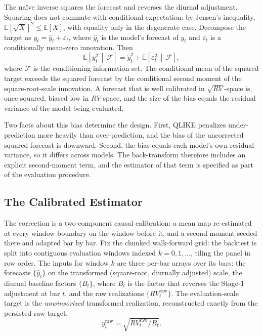 The na\"ive inverse squares the forecast and reverses the diurnal
adjustment. Squaring does not commute with conditional expectation: by
Jensen's inequality, $\mathbb{E}[\sqrt{X}]^2 \le \mathbb{E}[X]$, with
equality only in the degenerate case. Decompose the target as
$y_{t} = \hat{y}_{t} + \varepsilon_{t}$, where $\hat{y}_t$ is the model's
forecast of $y_t$ and $\varepsilon_t$ is a conditionally mean-zero
innovation. Then
\begin{equation}
    \mathbb{E}\!\left[y_t^2 \,\middle|\, \mathcal{F}\right]
    = \hat{y}_t^2 + \mathbb{E}\!\left[\varepsilon_t^2 \,\middle|\, \mathcal{F}\right],
    \label{eq:second_moment}
\end{equation}
where $\mathcal{F}$ is the conditioning information set. The conditional mean
of the squared target exceeds the squared forecast by the conditional second
moment of the square-root-scale innovation. A forecast that is well
calibrated in $\sqrt{RV}$-space is, once squared, biased low in $RV$-space,
and the size of the bias equals the residual variance of the model being
evaluated.

Two facts about this bias determine the design. First, QLIKE penalizes
under-prediction more heavily than over-prediction, and the bias of the
uncorrected squared forecast is downward. Second, the bias equals each
model's own residual variance, so it differs across models. The
back-transform therefore includes an explicit second-moment term, and the
estimator of that term is specified as part of the evaluation procedure.

\subsection{The Calibrated Estimator}
\label{sec:smearing_estimator}
\label{sec:smearing}

The correction is a two-component causal calibration: a mean map
re-estimated at every window boundary on the window before it, and a
second moment seeded there and adapted bar by bar. Fix the chunked
walk-forward grid: the backtest is split into contiguous evaluation
windows indexed $k = 0, 1, \dots$, tiling the panel in row order. The
inputs for window $k$ are three per-bar arrays over its bars: the
forecasts $\{\hat{y}_t\}$ on the transformed (square-root, diurnally
adjusted) scale, the diurnal baseline factors $\{B_t\}$, where $B_t$ is
the factor that reverses the Stage-1 adjustment at bar $t$, and the raw
realizations $\{RV^{\mathrm{raw}}_t\}$. The evaluation-scale target is the
\emph{unwinsorized} transformed realization, reconstructed exactly from
the persisted raw target,
\begin{equation}
    y^{\mathrm{raw}}_t = \sqrt{RV^{\mathrm{raw}}_t / B_t}.
    \label{eq:yraw}
\end{equation}

